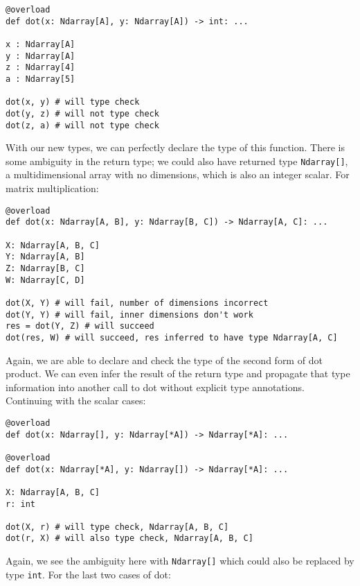 \documentclass[12pt]{report}
\begin{document}
\begin{singlespace*}
\begin{verbatim}
@overload
def dot(x: Ndarray[A], y: Ndarray[A]) -> int: ...

x : Ndarray[A]
y : Ndarray[A]
z : Ndarray[4]
a : Ndarray[5]

dot(x, y) # will type check
dot(y, z) # will not type check
dot(z, a) # will not type check
\end{verbatim}
\end{singlespace*}
With our new types, we can perfectly declare the type of this function. There is some ambiguity in the return type; we could also have returned type \texttt{Ndarray[]}, a multidimensional array with no dimensions, which is also an integer scalar. For matrix multiplication:

\begin{singlespace*}
\begin{verbatim}
@overload
def dot(x: Ndarray[A, B], y: Ndarray[B, C]) -> Ndarray[A, C]: ...

X: Ndarray[A, B, C]
Y: Ndarray[A, B]
Z: Ndarray[B, C]
W: Ndarray[C, D]

dot(X, Y) # will fail, number of dimensions incorrect
dot(Y, Y) # will fail, inner dimensions don't work
res = dot(Y, Z) # will succeed
dot(res, W) # will succeed, res inferred to have type Ndarray[A, C]\end{verbatim}
\end{singlespace*}
Again, we are able to declare and check the type of the second form of dot product. We can even infer the result of the return type and propagate that type information into another call to dot without explicit type annotations. Continuing with the scalar cases:

\begin{singlespace*}
\begin{verbatim}
@overload
def dot(x: Ndarray[], y: Ndarray[*A]) -> Ndarray[*A]: ...

@overload
def dot(x: Ndarray[*A], y: Ndarray[]) -> Ndarray[*A]: ...

X: Ndarray[A, B, C]
r: int

dot(X, r) # will type check, Ndarray[A, B, C]
dot(r, X) # will also type check, Ndarray[A, B, C]\end{verbatim}
\end{singlespace*}
Again, we see the ambiguity here with \texttt{Ndarray[]} which could also be replaced by type \texttt{int}. For the last two cases of dot:
\end{document}
